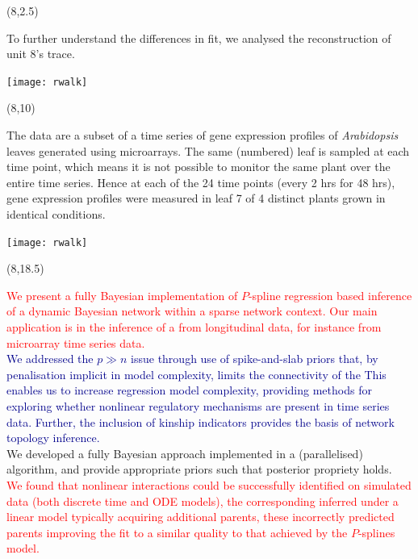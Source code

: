 \documentclass[a0,portrait]{a0poster}
\def\LHead#1{\noindent{\LARGE\color{DarkBlue} #1}\smallskip}
\begin{document}
\begin{textblock}{7}(8,2.5)

	To further understand the differences in fit, we analysed the reconstruction of unit 8's trace.  \\[3cm]

	\begin{center}
		\texttt{[image: rwalk]}
	\end{center}

\end{textblock}


\begin{textblock}{7}(8,10)

	\LHead{Microarray data}

	The data are a subset of a time series of gene expression profiles of \emph{Arabidopsis} leaves generated using microarrays. The same (numbered) leaf is sampled at each time point, which means it is not possible to monitor the same plant over the entire time series. Hence at each of the 24 time points (every 2 hrs for 48 hrs), gene expression profiles were measured in leaf 7 of 4 distinct plants grown in identical conditions.
	\vspace*{1.5cm}

	\begin{center}
		\texttt{[image: rwalk]}
	\end{center}

\end{textblock}

\begin{textblock}{7}(8,18.5)

	\LHead{Conclusions}

	\textcolor{red}{We present a fully Bayesian implementation of $P$-spline regression based inference of a dynamic Bayesian network within a sparse network context. Our main application is in the inference of a  from longitudinal data, for instance from microarray time series data.} \\[0.5cm]

	\textcolor{DarkBlue}{We addressed the $p \gg n$ issue through use of spike-and-slab priors that, by penalisation implicit in model complexity, limits the connectivity of the   This enables us to increase regression model complexity, providing methods for exploring whether nonlinear regulatory mechanisms are present in time series data.  Further, the inclusion of kinship indicators provides the basis of network topology inference.} \\[0.5cm]

	We developed a fully Bayesian approach implemented in a (parallelised)  algorithm, and provide appropriate priors such that posterior propriety holds. \\[0.5cm]

	\textcolor{red}{We found that nonlinear interactions could be successfully identified on simulated data (both discrete time and ODE models), the corresponding inferred  under a linear model typically acquiring additional parents, these incorrectly predicted parents improving the fit to a similar quality to that achieved by the $P$-splines model.}


\end{textblock}
\end{document}
